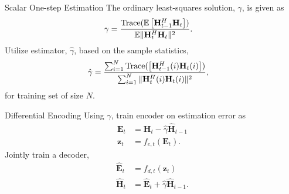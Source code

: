 \documentclass{beamer}
\begin{document}

  \begin{frame}{Scalar One-step Estimation}
    The ordinary least-squares solution, $\gamma$, is given as
    \begin{align*}
      \gamma &= \frac{\text{Trace}(\mathbb E\left[\mathbf H_{t-1}^H\mathbf H_{t}\right])}{\mathbb E\Arrowvert\mathbf H_t^H \mathbf H_t\Arrowvert^2}.
    \end{align*}
    \pause
    Utilize estimator, $\hat \gamma$, based on the sample statistics, %
    \begin{align*}
      \hat \gamma &= \frac{\sum_{i=1}^N\text{Trace}(\left[\mathbf H_{t-1}^H(i)\mathbf H_{t}(i)\right])}{\sum_{i=1}^N\Arrowvert\mathbf H_t^H(i) \mathbf H_t(i)\Arrowvert^2},
    \end{align*}
    for training set of size $N$.
  \end{frame}

  \begin{frame}{Differential Encoding}
    Using $\hat\gamma$, train encoder on estimation error as
    \begin{align*}
      \mathbf E_{t} &= \mathbf H_t - \hat \gamma \hat {\mathbf H}_{t-1} \\
      \mathbf z_t &= f_{e,t} (\mathbf E_t).
    \end{align*}
    Jointly train a decoder,
    \begin{align*}
      \hat{\mathbf E}_t &= f_{d,t}(\mathbf z_t) \\
      \hat{\mathbf H}_t &= \hat{\mathbf E}_t + \hat\gamma\hat{\mathbf H}_{t-1}.
    \end{align*}
  \end{frame}
\end{document}
